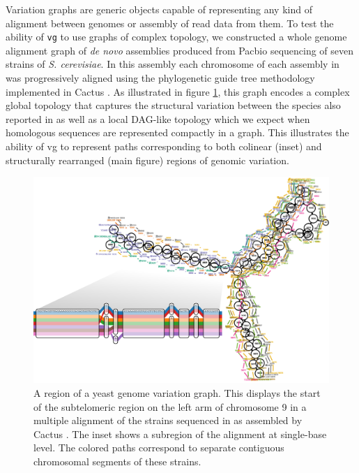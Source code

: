 Variation graphs are generic objects capable of representing any kind of alignment between genomes or assembly of read data from them.
To test the ability of {\tt vg} to use graphs of complex topology, we constructed a whole genome alignment graph of \emph{de novo} assemblies produced from Pacbio sequencing of seven strains of \emph{S. cerevisiae}.
In this assembly each chromosome of each assembly in \cite{yue2017contrasting} was progressively aligned using the phylogenetic guide tree methodology implemented in Cactus \cite{Paten:2011fva}.
As illustrated in figure \ref{fig:cactus_yeast_zoom}, this graph encodes a complex global topology that captures the structural variation between the species also reported in \cite{yue2017contrasting} as well as a local DAG-like topology which we expect when homologous sequences are represented compactly in a graph.
This illustrates the ability of vg to represent paths corresponding to both colinear (inset) and structurally rearranged (main figure) regions of genomic variation.

\begin{figure}[htbp!]
  \centering
  \includegraphics[width=1.0\textwidth]{Chapter3/Figs/cactus_yeast_zoom.pdf}
  \caption[Cactus yeast variation graph]{
  A region of a yeast genome variation graph.
  This displays the start of the subtelomeric region on the left arm of chromosome 9 in a multiple alignment of the strains sequenced in \cite{yue2017contrasting} as assembled by Cactus \cite{Paten:2011fva}.
  The inset shows a subregion of the alignment at single-base level.
  The colored paths correspond to separate contiguous chromosomal segments of these strains.
  }
  \label{fig:cactus_yeast_zoom}
\end{figure}


